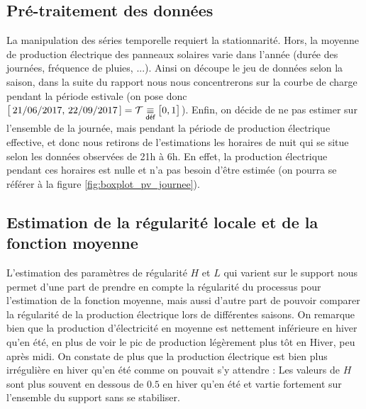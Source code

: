 \subsection{Pré-traitement des données}

La manipulation des séries temporelle requiert la stationnarité. Hors, la moyenne de production électrique des panneaux solaires varie dans l'année (durée des journées, fréquence de pluies, ...). Ainsi on découpe le jeu de données selon la saison, dans la suite du rapport nous nous concentrerons sur la courbe de charge pendant la période estivale (on pose donc $\bigl[ \, 21/06/2017, \, 22/09/2017 \, ] = \mathcal T \isdef \bigl[ 0, 1 \bigr]$). Enfin, on décide de ne pas estimer sur l'ensemble de la journée, mais pendant la période de production électrique effective, et donc nous retirons de l'estimations les horaires de nuit qui se situe selon les données observées de 21h à 6h. En effet, la production électrique pendant ces horaires est nulle et n'a pas besoin d'être estimée (on pourra se référer à la figure \ref{fig:boxplot_pv_journee}).


\subsection{Estimation de la régularité locale et de la fonction moyenne}


L'estimation des paramètres de régularité $H$ et $L$  qui varient sur le support nous permet d'une part de prendre en compte la régularité du processus pour l'estimation de la fonction moyenne, mais aussi d'autre part de pouvoir comparer la régularité de la production électrique lors de différentes saisons.
On remarque bien que la production d'électricité en moyenne est nettement inférieure en hiver qu'en été, en plus de voir le pic de production légèrement plus tôt en Hiver, peu après midi.
On constate de plus que la production électrique est bien plus irrégulière en hiver qu'en été comme on pouvait s'y attendre : Les valeurs de $H$ sont plus souvent en dessous de $0.5$ en hiver qu'en été et vartie fortement sur l'ensemble du support sans se stabiliser. 

